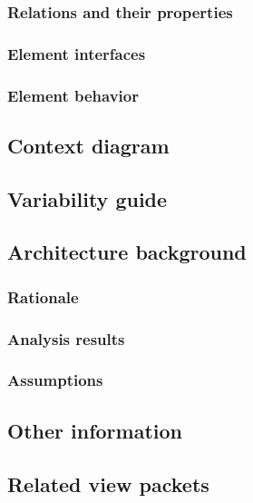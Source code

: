 \documentclass[a4paper,10pt]{paper}
\begin{document}
\subsubsection{Relations and their properties}

\subsubsection{Element interfaces}

\subsubsection{Element behavior}

\subsection{Context diagram}

\subsection{Variability guide}

\subsection{Architecture background}

\subsubsection{Rationale}

\subsubsection{Analysis results}

\subsubsection{Assumptions}

\subsection{Other information}

\subsection{Related view packets}
\end{document}
